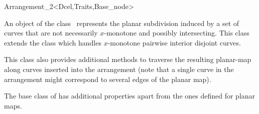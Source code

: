 
\ccRefPageBegin

\begin{ccRefClass}{Arrangement_2<Dcel,Traits,Base_node>} 
    
\ccDefinition An object  of the class
    \ccClassTemplateName\ represents the planar
    subdivision induced by a set of curves that are not necessarily 
    $x$-monotone and possibly intersecting. 
    This class extends
    the class 
    which handles $x$-monotone pairwise interior disjoint
    curves.  %

    This class also provides additional methods to traverse the
    resulting planar-map along curves inserted into the arrangement
    (note that a single curve in the arrangement might correspond to
    several edges of the planar map).


    The base class of  has additional
    properties apart from the ones defined for planar maps. 

    
\ccTypes




\end{ccRefClass}
